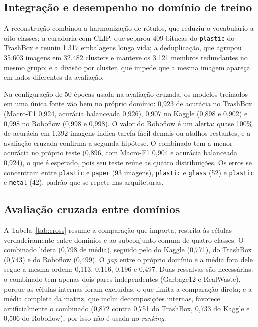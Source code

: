 \documentclass[11pt,a4paper]{article}
\begin{document}
	\subsection{Integração e desempenho no domínio de treino}
	
	A reconstrução combinou a harmonização de rótulos, que reduziu o vocabulário a oito classes; a curadoria com CLIP, que separou 409 bitucas do \texttt{plastic} do TrashBox e reuniu 1.317 embalagens longa vida; a deduplicação, que agrupou 35.603 imagens em 32.482 clusters e manteve os 3.121 membros redundantes no mesmo grupo; e a divisão por cluster, que impede que a mesma imagem apareça em lados diferentes da avaliação.
	
	Na configuração de 50 épocas usada na avaliação cruzada, os modelos treinados em uma única fonte vão bem no próprio domínio: 0,923 de acurácia no TrashBox (Macro-F1 0,924, acurácia balanceada 0,926), 0,907 no Kaggle (0,898 e 0,902) e 0,998 no Roboflow (0,998 e 0,998). O valor do Roboflow é um alerta: quase 100\% de acurácia em 1.392 imagens indica tarefa fácil demais ou atalhos restantes, e a avaliação cruzada confirma a segunda hipótese. O combinado tem a menor acurácia no próprio teste (0,896, com Macro-F1 0,904 e acurácia balanceada 0,924), o que é esperado, pois seu teste reúne as quatro distribuições. Os erros se concentram entre \texttt{plastic} e \texttt{paper} (93 imagens), \texttt{plastic} e \texttt{glass} (52) e \texttt{plastic} e \texttt{metal} (42), padrão que se repete nas arquiteturas.
	
	\subsection{Avaliação cruzada entre domínios}
	
	A Tabela~\ref{tab:cross} resume a comparação que importa, restrita às células verdadeiramente entre domínios e ao subconjunto comum de quatro classes. O combinado lidera (0,798 de média), seguido pelo do Kaggle (0,771), do TrashBox (0,743) e do Roboflow (0,499). O \emph{gap} entre o próprio domínio e a média fora dele segue a mesma ordem: 0,113, 0,116, 0,196 e 0,497. Duas ressalvas são necessárias: o combinado tem apenas dois pares independentes (Garbage12 e RealWaste), porque as células internas foram excluídas, o que limita a comparação direta; e a média completa da matriz, que inclui decomposições internas, favorece artificialmente o combinado (0,872 contra 0,751 do TrashBox, 0,733 do Kaggle e 0,506 do Roboflow), por isso não é usada no \emph{ranking}.
	
\end{document}
